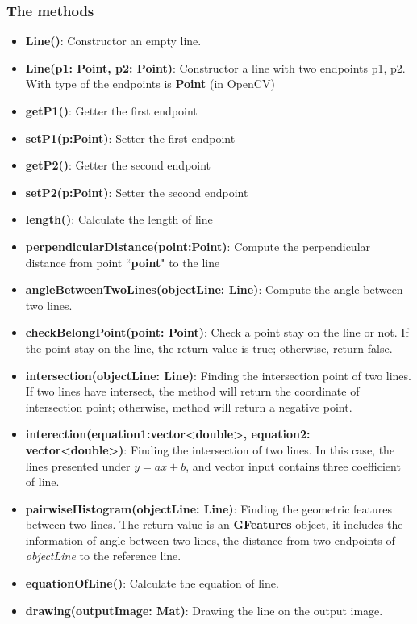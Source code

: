 \subsubsection{The methods}
\begin{itemize}
\item\textbf{Line()}: Constructor an empty line.
\item\textbf{Line(p1: Point, p2: Point)}: Constructor a line with two endpoints p1, p2. With type of the endpoints is \textbf{Point} (in OpenCV)
\item\textbf{getP1()}: Getter the first endpoint 
\item\textbf{setP1(p:Point)}: Setter the first endpoint
\item\textbf{getP2()}: Getter the second endpoint 
\item\textbf{setP2(p:Point)}: Setter the second endpoint
\item\textbf{length()}: Calculate the length of line
\item\textbf{perpendicularDistance(point:Point)}: Compute the perpendicular distance from point ``\textbf{point}" to the line
\item\textbf{angleBetweenTwoLines(objectLine: Line)}: Compute the angle between two lines.
\item\textbf{checkBelongPoint(point: Point)}: Check a point stay on the line or not. If the point stay on the line, the return value is true; otherwise, return false.
\item\textbf{intersection(objectLine: Line)}: Finding the intersection point of two lines. If two lines have intersect, the method will return the coordinate of intersection point; otherwise, method will return a negative point.
\item\textbf{interection(equation1:vector\textless double\textgreater, equation2: vector\textless double\textgreater)}: Finding the intersection of two lines. In this case, the lines presented under $y=ax + b$, and vector input contains three coefficient of line.
\item\textbf{pairwiseHistogram(objectLine: Line)}: Finding the geometric features between two lines. The return value is an \textbf{GFeatures} object, it includes the information of angle between two lines, the distance from two endpoints of \textit{objectLine} to the reference line.
\item\textbf{equationOfLine()}: Calculate the equation of line. 
\item\textbf{drawing(outputImage: Mat)}: Drawing the line on the output image.

\end{itemize}
